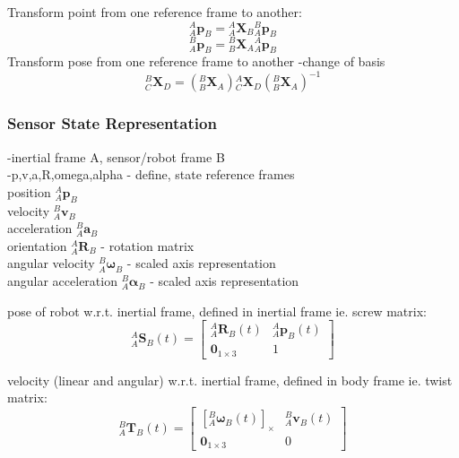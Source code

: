 		Transform point from one reference frame to another:
		\begin{equation}
			{^{A}_{A}\mathbf{p}^{}_{B}} = {^{A}_{A}\mathbf{X}^{}_{B}}{^{B}_{A}\mathbf{p}^{}_{B}}
		\end{equation}
		\begin{equation}
			{^{B}_{A}\mathbf{p}^{}_{B}} = {^{B}_{B}\mathbf{X}^{}_{A}}{^{A}_{A}\mathbf{p}^{}_{B}}
		\end{equation}
		Transform pose from one reference frame to another	
		-change of basis
		\begin{equation}
			{^{B}_{C}\mathbf{X}^{}_{D}} = ({^{B}_{B}\mathbf{X}^{}_{A}}){^{A}_{C}\mathbf{X}^{}_{D}}({^{B}_{B}\mathbf{X}^{}_{A}})^{-1}
		\end{equation}

	
	\subsubsection{Sensor State Representation}
		-inertial frame A, sensor/robot frame  B\\
		-p,v,a,R,omega,alpha - define, state reference frames\\	
		position $^{A}_{A}\mathbf{p}^{}_{B}$\\
		velocity $^{B}_{A}\mathbf{v}^{}_{B}$\\
		acceleration $^{B}_{A}\mathbf{a}^{}_{B}$\\
		orientation $^{A}_{A}\mathbf{R}^{}_{B}$ - rotation matrix\\
		angular velocity $^{B}_{A}\mathbf{\omega}^{}_{B}$ - scaled axis representation\\
		angular acceleration $^{B}_{A}\mathbf{\alpha}^{}_{B}$ - scaled axis representation
		
		pose of robot w.r.t. inertial frame, defined in inertial frame ie. screw matrix:
		\begin{equation}
				{^{A}_{A}\mathbf{S}^{}_{B}(t)} = 
				\begin{bmatrix}
						  ^{A}_{A}\mathbf{R}^{}_{B}(t) 	& 	^{A}_{A}\mathbf{p}^{}_{B}(t)\\
						  \textbf{0}_{1 \times 3} & 1						  
				\end{bmatrix}
		\end{equation}
		
		velocity (linear and angular) w.r.t. inertial frame, defined in body frame ie. twist matrix:
		\begin{equation}
				{^{B}_{A}\mathbf{T}^{}_{B}(t)} = 
				\begin{bmatrix}
		  {[^{B}_{A}\mathbf{\omega}^{}_{B}(t)]_\times} 	& 	^{B}_{A}\mathbf{v}^{}_{B}(t)\\
		  \textbf{0}_{1 \times 3} & 0						  
				\end{bmatrix}
		\end{equation}
				
